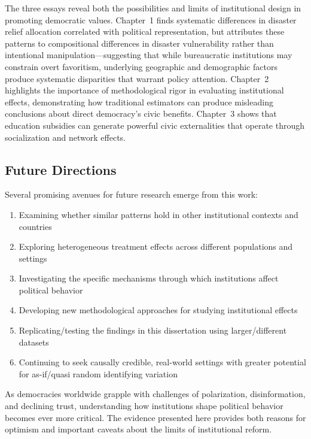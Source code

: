 \documentclass[12pt,letterpaper,oneside]{book}
\begin{document}
The three essays reveal both the possibilities and limits of institutional design in promoting democratic values. Chapter~1 finds systematic differences in disaster relief allocation correlated with political representation, but attributes these patterns to compositional differences in disaster vulnerability rather than intentional manipulation---suggesting that while bureaucratic institutions may constrain overt favoritism, underlying geographic and demographic factors produce systematic disparities that warrant policy attention. Chapter~2 highlights the importance of methodological rigor in evaluating institutional effects, demonstrating how traditional estimators can produce misleading conclusions about direct democracy's civic benefits. Chapter~3 shows that education subsidies can generate powerful civic externalities that operate through socialization and network effects.

\subsection*{Future Directions}

Several promising avenues for future research emerge from this work:

\begin{enumerate}
    \item Examining whether similar patterns hold in other institutional contexts and countries
    \item Exploring heterogeneous treatment effects across different populations and settings
    \item Investigating the specific mechanisms through which institutions affect political behavior
    \item Developing new methodological approaches for studying institutional effects
    \item Replicating/testing the findings in this dissertation using larger/different datasets
    \item Continuing to seek causally credible, real-world settings with greater potential for as-if/quasi random identifying variation
  \end{enumerate}

As democracies worldwide grapple with challenges of polarization, disinformation, and declining trust, understanding how institutions shape political behavior becomes ever more critical. The evidence presented here provides both reasons for optimism and important caveats about the limits of institutional reform.
\end{document}
